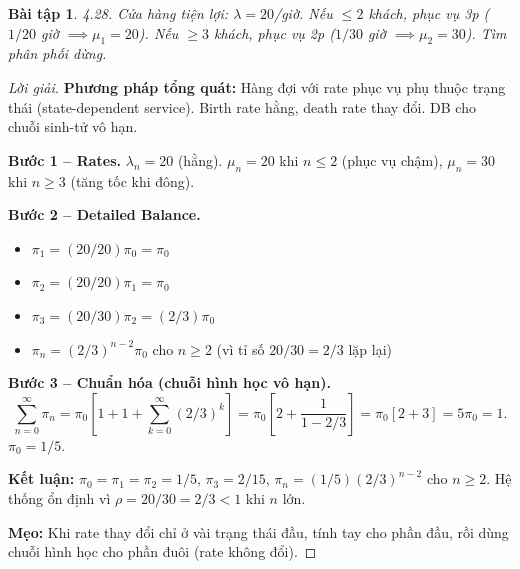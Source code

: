 \documentclass[8pt,a4paper]{article}
\newtheorem{exercise}{Bài tập}
\newenvironment{solution}{\begin{proof}[Lời giải]}{\end{proof}}
\begin{document}
\begin{exercise}
4.28. Cửa hàng tiện lợi: $\lambda = 20$/giờ. Nếu $\le 2$ khách, phục vụ 3p ($1/20$ giờ $\implies \mu_1 = 20$). Nếu $\ge 3$ khách, phục vụ 2p ($1/30$ giờ $\implies \mu_2 = 30$). Tìm phân phối dừng.
\end{exercise}
\begin{solution}
\textbf{Phương pháp tổng quát:} Hàng đợi với rate phục vụ phụ thuộc trạng thái (state-dependent service). Birth rate hằng, death rate thay đổi. DB cho chuỗi sinh-tử vô hạn.

\textbf{Bước 1 -- Rates.} $\lambda_n = 20$ (hằng). $\mu_n = 20$ khi $n \le 2$ (phục vụ chậm), $\mu_n = 30$ khi $n \ge 3$ (tăng tốc khi đông).

\textbf{Bước 2 -- Detailed Balance.}
\begin{itemize}[nosep]
\item $\pi_1 = (20/20)\pi_0 = \pi_0$
\item $\pi_2 = (20/20)\pi_1 = \pi_0$
\item $\pi_3 = (20/30)\pi_2 = (2/3)\pi_0$
\item $\pi_n = (2/3)^{n-2}\pi_0$ cho $n \ge 2$ \quad (vì tỉ số $20/30 = 2/3$ lặp lại)
\end{itemize}

\textbf{Bước 3 -- Chuẩn hóa (chuỗi hình học vô hạn).}
\[
\sum_{n=0}^\infty \pi_n = \pi_0\left[1 + 1 + \sum_{k=0}^\infty (2/3)^k\right] = \pi_0\left[2 + \frac{1}{1-2/3}\right] = \pi_0[2 + 3] = 5\pi_0 = 1.
\]
$\pi_0 = 1/5$.

\textbf{Kết luận:} $\boxed{\pi_0 = \pi_1 = \pi_2 = 1/5}$, $\pi_3 = 2/15$, $\pi_n = (1/5)(2/3)^{n-2}$ cho $n \ge 2$. Hệ thống ổn định vì $\rho = 20/30 = 2/3 < 1$ khi $n$ lớn.

\textbf{Mẹo:} Khi rate thay đổi chỉ ở vài trạng thái đầu, tính tay cho phần đầu, rồi dùng chuỗi hình học cho phần đuôi (rate không đổi).
\end{solution}
\end{document}
